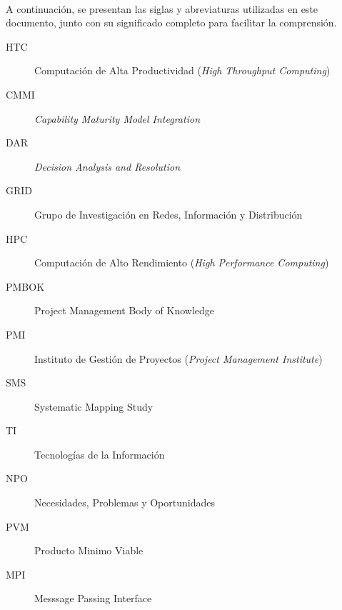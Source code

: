 \label{cap:siglas}
\mbox{}\\
A continuación, se presentan las siglas y abreviaturas utilizadas en este documento, junto con su significado completo para facilitar la comprensión.
\begin{description}
	\item[HTC] Computación de Alta Productividad (\textit{High Throughput Computing})
	\item[CMMI] \textit{Capability Maturity Model Integration}
	\item[DAR] \textit{Decision Analysis and Resolution}
	\item[GRID] Grupo de Investigación en Redes, Información y Distribución
	\item[HPC] Computación de Alto Rendimiento (\textit{High Performance Computing})
	\item[PMBOK] Project Management Body of Knowledge
	\item[PMI] Instituto de Gestión de Proyectos (\textit{Project Management Institute})
	\item[SMS] Systematic Mapping Study
	\item[TI] Tecnologías de la Información
	\item[NPO] Necesidades, Problemas y Oportunidades
	\item[PVM] Producto Minimo Viable
	\item[MPI] Messsage Passing Interface
\end{description}

